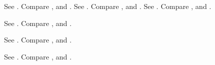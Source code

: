 See \cite{doe2020}.
Compare \cite{doe2020}, and \parencite{alpha-1, beta_2}.
See \cite{doe2020}.
Compare \cite{doe2020}, and \parencite{alpha-1, beta_2}.
See \cite{doe2020}.
Compare \cite{doe2020}, and \parencite{alpha-1, beta_2}.
\begin{frame}[t]
See \cite{doe2020}.
Compare \cite{doe2020}, and \parencite{alpha-1, beta_2}.
\end{frame}

\begin{frame}[t]
See \cite{doe2020}.
Compare \cite{doe2020}, and \parencite{alpha-1, beta_2}.
\end{frame}

\begin{frame}[t]
See \cite{doe2020}.
Compare \cite{doe2020}, and \parencite{alpha-1, beta_2}.
\end{frame}

